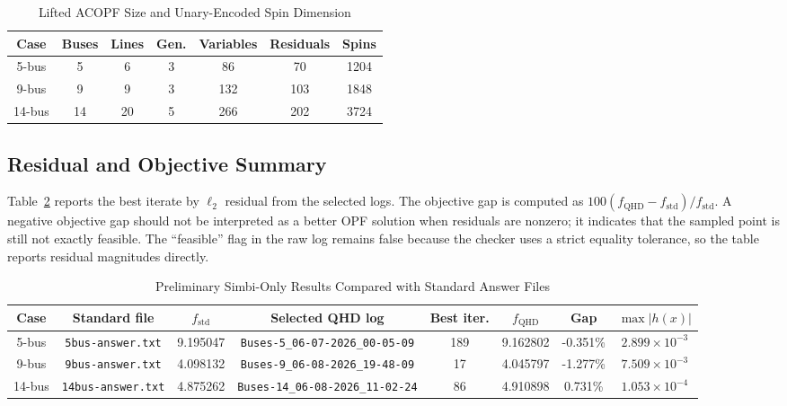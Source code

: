 \documentclass[journal]{IEEEtran}
\begin{document}
\begin{table}[!t]
\caption{Lifted ACOPF Size and Unary-Encoded Spin Dimension}
\label{tab:size}
\centering
\begin{tabular}{c|c|c|c|c|c|c}
\hline
Case & Buses & Lines & Gen. & Variables & Residuals & Spins \\
\hline
5-bus  & 5  & 6  & 3 & 86  & 70  & 1204 \\
9-bus  & 9  & 9  & 3 & 132 & 103 & 1848 \\
14-bus & 14 & 20 & 5 & 266 & 202 & 3724 \\
\hline
\end{tabular}
\end{table}

\subsection{Residual and Objective Summary}
Table~\ref{tab:simbi-results} reports the best iterate by $\ell_2$ residual from the selected logs. The objective gap is computed as $100(f_{\mathrm{QHD}}-f_{\mathrm{std}})/f_{\mathrm{std}}$. A negative objective gap should not be interpreted as a better OPF solution when residuals are nonzero; it indicates that the sampled point is still not exactly feasible. The ``feasible'' flag in the raw log remains false because the checker uses a strict equality tolerance, so the table reports residual magnitudes directly.

\begin{table}[!t]
\caption{Preliminary Simbi-Only Results Compared with Standard Answer Files}
\label{tab:simbi-results}
\centering
\begin{tabular}{c|c|c|c|c|c|c|c}
\hline
Case & Standard file & $f_{\mathrm{std}}$ & Selected QHD log & Best iter. & $f_{\mathrm{QHD}}$ & Gap & $\max |h(x)|$ \\
\hline
5-bus  & \texttt{5bus-answer.txt}  & 9.195047 & \texttt{Buses-5\_06-07-2026\_00-05-09}  & 189 & 9.162802 & -0.351\% & $2.899{\times}10^{-3}$ \\
9-bus  & \texttt{9bus-answer.txt}  & 4.098132 & \texttt{Buses-9\_06-08-2026\_19-48-09}  & 17  & 4.045797 & -1.277\% & $7.509{\times}10^{-3}$ \\
14-bus & \texttt{14bus-answer.txt} & 4.875262 & \texttt{Buses-14\_06-08-2026\_11-02-24} & 86  & 4.910898 & 0.731\% & $1.053{\times}10^{-4}$ \\
\hline
\end{tabular}
\end{table}
\end{document}
